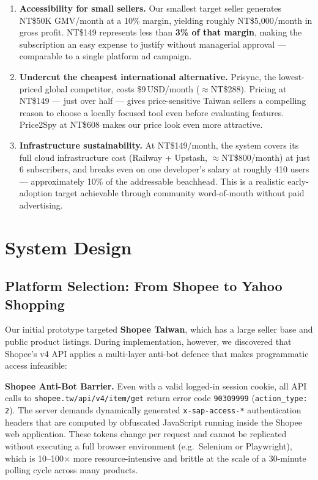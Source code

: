 \documentclass[11pt,a4paper]{article}
\begin{document}
\begin{enumerate}
  \item \textbf{Accessibility for small sellers.}
        Our smallest target seller generates NT\$50K GMV/month at a 10\% margin,
        yielding roughly NT\$5,000/month in gross profit.
        NT\$149 represents less than \textbf{3\% of that margin},
        making the subscription an easy expense to justify without managerial
        approval --- comparable to a single platform ad campaign.

  \item \textbf{Undercut the cheapest international alternative.}
        Prisync, the lowest-priced global competitor, costs \$9\,USD/month
        ($\approx$NT\$288). Pricing at NT\$149 --- just over half --- gives
        price-sensitive Taiwan sellers a compelling reason to choose a
        locally focused tool even before evaluating features.
        Price2Spy at NT\$608 makes our price look even more attractive.

  \item \textbf{Infrastructure sustainability.}
        At NT\$149/month, the system covers its full cloud infrastructure cost
        (Railway + Upstash, $\approx$NT\$800/month) at just 6 subscribers,
        and breaks even on one developer's salary at roughly 410 users ---
        approximately 10\% of the addressable beachhead.
        This is a realistic early-adoption target achievable through community
        word-of-mouth without paid advertising.
\end{enumerate}

\newpage
\section{System Design}

\subsection{Platform Selection: From Shopee to Yahoo Shopping}

Our initial prototype targeted \textbf{Shopee Taiwan}, which has a large seller
base and public product listings. During implementation, however, we discovered
that Shopee's v4 API applies a multi-layer anti-bot defence that makes
programmatic access infeasible:

\begin{warnbox}
\textbf{Shopee Anti-Bot Barrier.}
Even with a valid logged-in session cookie, all API calls to
\texttt{shopee.tw/api/v4/item/get} return error code \texttt{90309999}
(\texttt{action\_type: 2}). The server demands dynamically generated
\texttt{x-sap-access-*} authentication headers that are computed
by obfuscated JavaScript running inside the Shopee web application.
These tokens change per request and cannot be replicated without executing
a full browser environment (e.g.\ Selenium or Playwright),
which is 10--100$\times$ more resource-intensive and brittle at the
scale of a 30-minute polling cycle across many products.
\end{warnbox}
\end{document}
